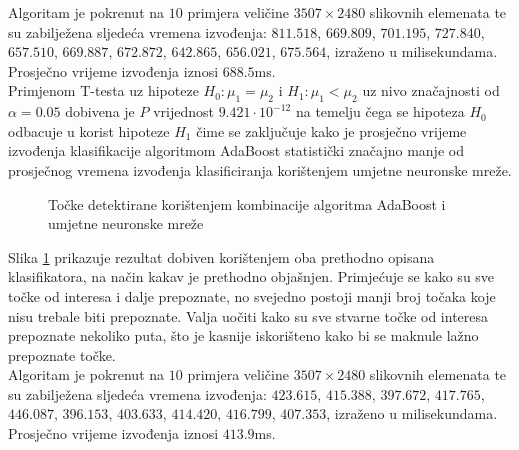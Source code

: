 \documentclass[times, utf8, zavrsni, numeric]{fer}
\begin{document}
Algoritam je pokrenut na $10$ primjera veličine $3507\times2480$ slikovnih elemenata te su zabilježena sljedeća vremena izvođenja: $811.518$, $669.809$, $701.195$, $727.840$, $657.510$, $669.887$, $672.872$, $642.865$, $656.021$, $675.564$, izraženo u milisekundama. 
Prosječno vrijeme izvođenja iznosi $688.5$ms.\\

Primjenom T-testa uz hipoteze $H_0: \mu_1 = \mu_2$ i $H_1: \mu_1 < \mu_2$ uz nivo značajnosti od $\alpha = 0.05$ dobivena je $P$ vrijednost $9.421\cdot10^{-12}$ na temelju čega se hipoteza $H_0$ odbacuje u korist hipoteze $H_1$ čime se zaključuje kako je prosječno vrijeme izvođenja klasifikacije algoritmom AdaBoost statistički značajno manje od prosječnog vremena izvođenja klasificiranja korištenjem umjetne neuronske mreže.

\begin{figure}[!ht]
    \centering
    \captionsetup{justification=centering}
    \caption{Točke detektirane korištenjem kombinacije algoritma AdaBoost i umjetne neuronske mreže}
    \label{fig:combinedResult}
\end{figure}

Slika \ref{fig:combinedResult} prikazuje rezultat dobiven korištenjem oba prethodno opisana klasifikatora, na način kakav je prethodno objašnjen.
Primjećuje se kako su sve točke od interesa i dalje prepoznate, no svejedno postoji manji broj točaka koje nisu trebale biti prepoznate.
Valja uočiti kako su sve stvarne točke od interesa prepoznate nekoliko puta, što je kasnije iskorišteno kako bi se maknule lažno prepoznate točke.\\

Algoritam je pokrenut na $10$ primjera veličine $3507\times2480$ slikovnih elemenata te su zabilježena sljedeća vremena izvođenja: $423.615$, $415.388$, $397.672$, $417.765$, $446.087$, $396.153$, $403.633$, $414.420$, $416.799$, $407.353$, izraženo u milisekundama. 
Prosječno vrijeme izvođenja iznosi $413.9$ms.\\
\end{document}
